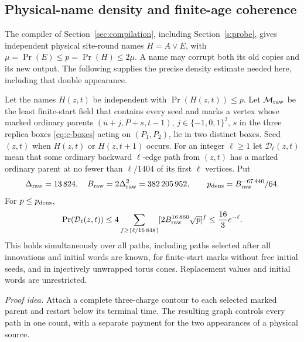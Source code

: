 \subsection{Physical-name density and finite-age coherence}\label{v:density-section}
The compiler of Section~\ref{sec:compilation}, including Section~\ref{s:probe}, gives
independent physical site-round names \(H=A\lor E\), with
\(\mu=\Pr(E)\le p=\Pr(H)\le2\mu\). A name may corrupt both its old
copies and its new output. The following supplies the precise density
estimate needed here, including that double appearance.

\begin{lemma}\label{v:density}
Let the names \(H(z,t)\) be independent with \(\Pr(H(z,t))\le p\).
Let \(\mathcal M_{\rm raw}\) be the least finite-start field that contains
every seed and marks a vertex whose marked ordinary parents
\((u+j,P+s,t-1)\), \(j\in\{-1,0,1\}^2\), \(s\) in the three replica boxes
\eqref{eq:c-boxes} acting on \((P_1,P_2)\), lie in two distinct boxes.
Seed \((z,t)\) when \(H(z,t)\) or \(H(z,t+1)\) occurs.
For an integer \(\ell\ge1\) let \(\mathcal D_\ell(z,t)\) mean that some
ordinary backward \(\ell\)-edge path from \((z,t)\) has a marked ordinary
parent at no fewer than \(\ell/1404\) of its first \(\ell\) vertices. Put
\[
 \Delta_{\rm raw}=13\,824,\quad B_{\rm raw}=2\Delta_{\rm raw}^2=382\,205\,952,
 \qquad p_{\rm dens}=B_{\rm raw}^{-67\,440}/64.
\]
For \(p\le p_{\rm dens}\),
\begin{equation}\label{v:density-bound}
 \Pr(\mathcal D_\ell(z,t))\le
 4\sum_{f\ge\lceil\ell/16\,848\rceil}
 [2B_{\rm raw}^{16\,860}\sqrt p]^f\le\frac{16}{3}e^{-\ell}.
\end{equation}
This holds simultaneously over all paths, including paths selected
after all innovations and initial words are known, for finite-start
marks without free initial seeds, and in injectively unwrapped torus
cones. Replacement values and initial words are unrestricted.
\end{lemma}
\par\noindent\emph{Proof idea.} Attach a complete three-charge contour to each selected marked parent and restart below its terminal time. The resulting graph controls every path in one count, with a separate payment for the two appearances of a physical source.

